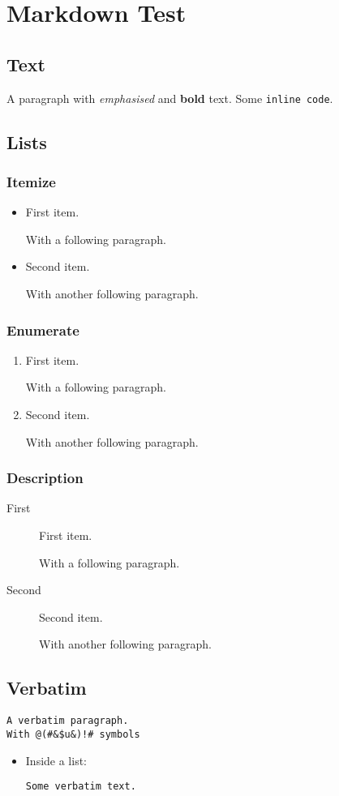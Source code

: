 \documentclass[
  text,
  markdown={section level=3},
]{internet}
\begin{document}
\section{Markdown Test}

\subsection{Text}

A paragraph with \emph{emphasised} and \textbf{bold} text.
Some \verb+inline code+.

\subsection{Lists}

\subsubsection{Itemize}

\begin{itemize}
\item First item.

With a following paragraph.

\item Second item.

With another following paragraph.
\end{itemize}

\subsubsection{Enumerate}

\begin{enumerate}
\item First item.

With a following paragraph.

\item Second item.

With another following paragraph.
\end{enumerate}

\subsubsection{Description}

\begin{description}
\item[First] First item.

With a following paragraph.

\item[Second] Second item.

With another following paragraph.
\end{description}

\subsection{Verbatim}

\begin{verbatim}
A verbatim paragraph.
With @(#&$u&)!# symbols
\end{verbatim}

\begin{itemize}
\item Inside a list:

\begin{verbatim}
Some verbatim text.
\end{verbatim}

\end{itemize}
\end{document}
